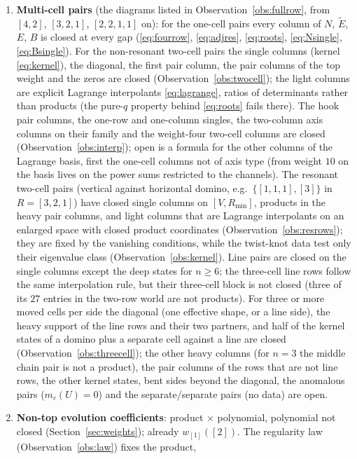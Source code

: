 \documentclass[11pt]{article}
\newcommand{\Et}{\widetilde{E}}
\begin{document}
\begin{enumerate}
\item \textbf{Multi-cell pairs} (the diagrams listed in Observation~\ref{obs:fullrow}, from $[4,2]$, $[3,2,1]$,
$[2,2,1,1]$ on): for the one-cell pairs every column of $N$, $\Et$, $E$, $B$ is closed at every gap
(\eqref{eq:fourrow}, \eqref{eq:adjres}, \eqref{eq:roots}, \eqref{eq:Nsingle}, \eqref{eq:Bsingle}).  For the non-resonant
two-cell pairs the single columns (kernel \eqref{eq:kernel}), the diagonal, the first pair column, the pair columns of
the top weight and the zeros are closed (Observation~\ref{obs:twocell}); the light columns are explicit Lagrange
interpolants \eqref{eq:lagrange}, ratios of determinants rather than products (the pure-$q$ property behind
\eqref{eq:roots} fails there).  The hook pair columns, the one-row and one-column singles, the two-column axis columns on
their family and the weight-four two-cell columns are closed (Observation~\ref{obs:interp}); open is a formula for the
other columns of the Lagrange basis, first the one-cell columns not of axis type (from weight $10$ on the basis lives on
the power sums restricted to the channels).  The resonant two-cell pairs (vertical against horizontal domino, e.g.\
$\{[1,1,1],[3]\}$ in $R=[3,2,1]$) have closed single columns on $[V,R_{\min}]$, products in the heavy pair columns, and
light columns that are Lagrange interpolants on an enlarged space with closed product coordinates
(Observation~\ref{obs:resrows}); they are fixed by the vanishing conditions, while the twist-knot data test only their
eigenvalue class (Observation~\ref{obs:kernel}).  Line pairs are closed on the single columns except the deep states for
$n\ge6$; the three-cell line rows follow the same interpolation rule, but their three-cell block is not closed (three of
its $27$ entries in the two-row world are not products).  For three or more moved cells per side the diagonal (one
effective shape, or a line side), the heavy support of the line rows and their two partners, and half of the kernel
states of a domino plus a separate cell against a line are closed (Observation~\ref{obs:threecell}); the other heavy
columns (for $n=3$ the middle chain pair is not a product), the pair columns of the rows that are not line rows, the
other kernel states, bent sides beyond the diagonal, the anomalous pairs ($m_c(U)=0$) and the separate/separate pairs
(no data) are open.
\item \textbf{Non-top evolution coefficients}: product $\times$ polynomial, polynomial not closed
(Section~\ref{sec:weights}); already $w_{[1]}([2])$.  The regularity law (Observation~\ref{obs:law}) fixes the product,

\end{enumerate}
\end{document}
